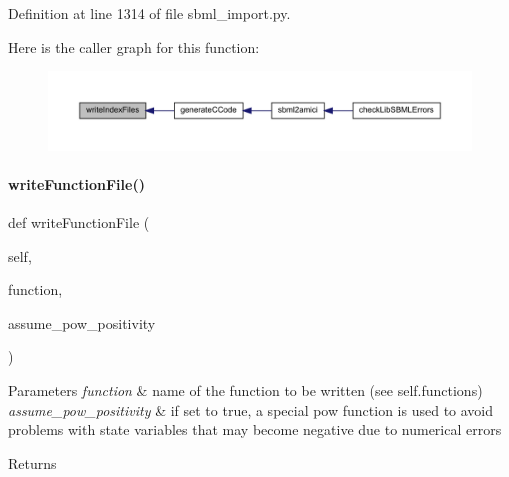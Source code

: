 Definition at line 1314 of file sbml\+\_\+import.\+py.

Here is the caller graph for this function\+:
\nopagebreak
\begin{figure}[H]
\begin{center}
\leavevmode
\includegraphics[width=350pt]{classamici_1_1sbml__import_1_1_sbml_importer_a3d3ce5678111ebd3987ec0539f07438e_icgraph}
\end{center}
\end{figure}
\mbox{\label{classamici_1_1sbml__import_1_1_sbml_importer_a85e1499fa29b10b4a0b4afc82feec4e9}} 
\paragraph{\texorpdfstring{write\+Function\+File()}{writeFunctionFile()}}
{\footnotesize\ttfamily def write\+Function\+File (\begin{DoxyParamCaption}\item[{}]{self,  }\item[{}]{function,  }\item[{}]{assume\+\_\+pow\+\_\+positivity }\end{DoxyParamCaption})}


\begin{DoxyParams}{Parameters}
{\em function} & name of the function to be written (see self.\+functions) \\
\hline
{\em assume\+\_\+pow\+\_\+positivity} & if set to true, a special pow function is used to avoid problems with state variables that may become negative due to numerical errors\\
\hline
\end{DoxyParams}
\begin{DoxyReturn}{Returns}

\end{DoxyReturn}



